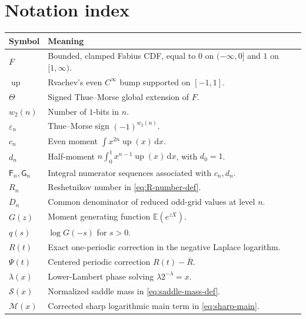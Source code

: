 \documentclass[11pt,oneside]{article}
\theoremstyle{definition}
\theoremstyle{remark}
\newcommand{\upf}{\operatorname{up}}
\newcommand{\wt}{w_2}
\newcommand{\epsTM}{\varepsilon}
\newcommand{\dd}{\,\mathrm d}
\newcommand{\E}{\mathbb E}
\newcommand{\Thetaf}{\Theta}
\newcommand{\Lam}{\lambda}
\newcommand{\PsiPer}{\Psi}
\begin{document}
\section{Notation index}\label{app:notation}

\begin{longtable}{p{}p{}}
\toprule
Symbol & Meaning\\
\midrule
$F$ & Bounded, clamped Fabius CDF, equal to $0$ on $(-\infty,0]$ and $1$ on
$[1,\infty)$.\\
$\upf$ & Rvachev's even $C^\infty$ bump supported on $[-1,1]$.\\
$\Thetaf$ & Signed Thue--Morse global extension of $F$.\\
$\wt(n)$ & Number of $1$-bits in $n$.\\
$\epsTM_n$ & Thue--Morse sign $(-1)^{\wt(n)}$.\\
$c_n$ & Even moment $\int x^{2n}\upf(x)\dd x$.\\
$d_n$ & Half-moment $n\int_0^1x^{n-1}\upf(x)\dd x$, with $d_0=1$.\\
$\mathsf F_n,\mathsf G_n$ & Integral numerator sequences associated with $c_n,d_n$.\\
$R_n$ & Reshetnikov number in \eqref{eq:R-number-def}.\\
$D_n$ & Common denominator of reduced odd-grid values at level $n$.\\
$G(z)$ & Moment generating function $\E(e^{zX})$.\\
$q(s)$ & $\log G(-s)$ for $s>0$.\\
$R(t)$ & Exact one-periodic correction in the negative Laplace logarithm.\\
$\PsiPer(t)$ & Centered periodic correction $R(t)-\overline R$.\\
$\Lam(x)$ & Lower-Lambert phase solving $\Lam2^{-\Lam}=x$.\\
$\mathcal S(x)$ & Normalized saddle mass in \eqref{eq:saddle-mass-def}.\\
$\mathcal M(x)$ & Corrected sharp logarithmic main term in \eqref{eq:sharp-main}.\\
\bottomrule
\end{longtable}
\end{document}
